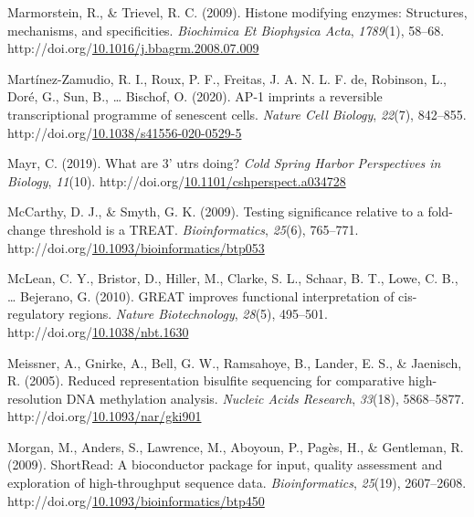 \documentclass[12pt,twoside]{reedthesis}
\newlength{\cslhangindent}
\newenvironment{CSLReferences}[2] %
 {%
  \setlength{\parindent}{0pt}
  \ifodd #1 \everypar{\setlength{\hangindent}{\cslhangindent}}\ignorespaces\fi
  \ifnum #2 > 0
  \setlength{\parskip}{#2\baselineskip}
  \fi
 }%
 {}
\begin{document}
\begin{CSLReferences}{1}{0}
\leavevmode{}%
Marmorstein, R., \& Trievel, R. C. (2009). Histone modifying enzymes: Structures, mechanisms, and specificities. \emph{Biochimica Et Biophysica Acta}, \emph{1789}(1), 58--68. http://doi.org/\href{https://doi.org/10.1016/j.bbagrm.2008.07.009}{10.1016/j.bbagrm.2008.07.009}

\leavevmode{}%
Martínez-Zamudio, R. I., Roux, P. F., Freitas, J. A. N. L. F. de, Robinson, L., Doré, G., Sun, B., \ldots{} Bischof, O. (2020). AP-1 imprints a reversible transcriptional programme of senescent cells. \emph{Nature Cell Biology}, \emph{22}(7), 842--855. http://doi.org/\href{https://doi.org/10.1038/s41556-020-0529-5}{10.1038/s41556-020-0529-5}

\leavevmode{}%
Mayr, C. (2019). What are 3' utrs doing? \emph{Cold Spring Harbor Perspectives in Biology}, \emph{11}(10). http://doi.org/\href{https://doi.org/10.1101/cshperspect.a034728}{10.1101/cshperspect.a034728}

\leavevmode{}%
McCarthy, D. J., \& Smyth, G. K. (2009). Testing significance relative to a fold-change threshold is a TREAT. \emph{Bioinformatics}, \emph{25}(6), 765--771. http://doi.org/\href{https://doi.org/10.1093/bioinformatics/btp053}{10.1093/bioinformatics/btp053}

\leavevmode{}%
McLean, C. Y., Bristor, D., Hiller, M., Clarke, S. L., Schaar, B. T., Lowe, C. B., \ldots{} Bejerano, G. (2010). GREAT improves functional interpretation of cis-regulatory regions. \emph{Nature Biotechnology}, \emph{28}(5), 495--501. http://doi.org/\href{https://doi.org/10.1038/nbt.1630}{10.1038/nbt.1630}

\leavevmode{}%
Meissner, A., Gnirke, A., Bell, G. W., Ramsahoye, B., Lander, E. S., \& Jaenisch, R. (2005). Reduced representation bisulfite sequencing for comparative high-resolution DNA methylation analysis. \emph{Nucleic Acids Research}, \emph{33}(18), 5868--5877. http://doi.org/\href{https://doi.org/10.1093/nar/gki901}{10.1093/nar/gki901}

\leavevmode{}%
Morgan, M., Anders, S., Lawrence, M., Aboyoun, P., Pagès, H., \& Gentleman, R. (2009). ShortRead: A bioconductor package for input, quality assessment and exploration of high-throughput sequence data. \emph{Bioinformatics}, \emph{25}(19), 2607--2608. http://doi.org/\href{https://doi.org/10.1093/bioinformatics/btp450}{10.1093/bioinformatics/btp450}


\end{CSLReferences}
\end{document}
